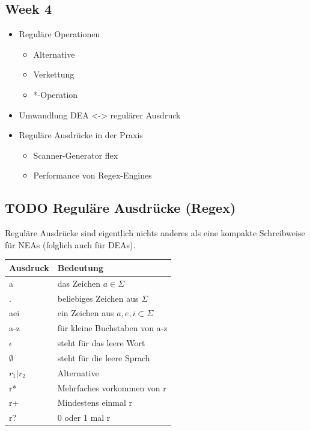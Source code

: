 \documentclass[11pt,twoside,landscape]{article}
\begin{document}
\begin{multicols}{3}
\section{Week 4}
\label{sec:orgbe79a80}
\begin{itemize}
\item Reguläre Operationen
\begin{itemize}
\item Alternative
\item Verkettung
\item *-Operation
\end{itemize}
\item Umwandlung DEA <-> regulärer Ausdruck
\item Reguläre Ausdrücke in der Praxis
\begin{itemize}
\item Scanner-Generator flex
\item Performance von Regex-Engines
\end{itemize}
\end{itemize}


\subsection{{\bfseries\sffamily TODO} Reguläre Ausdrücke (Regex)}
\label{sec:orgf08fe91}
Reguläre Ausdrücke sind eigentlich nichts anderes als eine kompakte Schreibweise für NEAs (folglich auch für DEAs).
\begin{center}
\begin{tabular}{ll}
Ausdruck & Bedeutung\\
\hline
a & das Zeichen \(a \in \Sigma\)\\
. & beliebiges Zeichen aus \(\Sigma\)\\
aei & ein Zeichen aus \({a, e, i} \subset \Sigma\)\\
a-z & für kleine Buchstaben von a-z\\
\(\epsilon\) & steht für das leere Wort\\
\(\emptyset\) & steht für die leere Sprach\\
\(r_{1}\vert r_{2}\) & Alternative\\
r* & Mehrfaches vorkommen von r\\
r+ & Mindestens einmal r\\
r? & 0 oder 1 mal r\\
\end{tabular}
\end{center}



\end{multicols}
\end{document}
